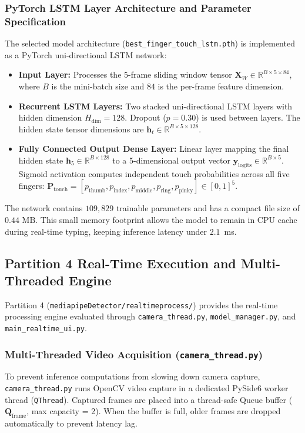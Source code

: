 \subsubsection{PyTorch LSTM Layer Architecture and Parameter Specification}
The selected model architecture (\texttt{best\_finger\_touch\_lstm.pth}) is implemented as a PyTorch uni-directional LSTM network:
\begin{itemize}
    \item \textbf{Input Layer:} Processes the 5-frame sliding window tensor $\mathbf{X}_W \in \mathbb{R}^{B \times 5 \times 84}$, where $B$ is the mini-batch size and $84$ is the per-frame feature dimension.
    \item \textbf{Recurrent LSTM Layers:} Two stacked uni-directional LSTM layers with hidden dimension $H_{\text{dim}} = 128$. Dropout ($p = 0.30$) is used between layers. The hidden state tensor dimensions are $\mathbf{h}_t \in \mathbb{R}^{B \times 5 \times 128}$.
    \item \textbf{Fully Connected Output Dense Layer:} Linear layer mapping the final hidden state $\mathbf{h}_5 \in \mathbb{R}^{B \times 128}$ to a 5-dimensional output vector $\mathbf{y}_{\text{logits}} \in \mathbb{R}^{B \times 5}$. Sigmoid activation computes independent touch probabilities across all five fingers: $\mathbf{P}_{\text{touch}} = [p_{\text{thumb}}, p_{\text{index}}, p_{\text{middle}}, p_{\text{ring}}, p_{\text{pinky}}] \in [0, 1]^5$.
\end{itemize}

The network contains $109,829$ trainable parameters and has a compact file size of $0.44\text{ MB}$. This small memory footprint allows the model to remain in CPU cache during real-time typing, keeping inference latency under $2.1$~ms.

\subsection{Partition 4 Real-Time Execution and Multi-Threaded Engine}
Partition 4 (\texttt{mediapipeDetector/realtimeprocess/}) provides the real-time processing engine evaluated through \texttt{camera\_thread.py}, \texttt{model\_manager.py}, and \texttt{main\_realtime\_ui.py}.

\subsubsection{Multi-Threaded Video Acquisition (\texttt{camera\_thread.py})}
To prevent inference computations from slowing down camera capture, \texttt{camera\_thread.py} runs OpenCV video capture in a dedicated PySide6 worker thread (\texttt{QThread}). Captured frames are placed into a thread-safe Queue buffer ($\mathbf{Q}_{\text{frame}}$, max capacity = 2). When the buffer is full, older frames are dropped automatically to prevent latency lag.

